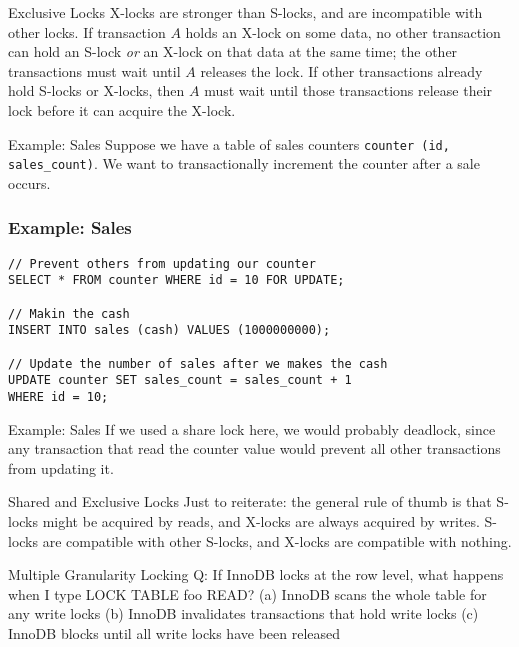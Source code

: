 \documentclass[14pt]{beamer}
\begin{document}
\begin{frame}{Exclusive Locks}
  X-locks are stronger than S-locks, and are incompatible with other locks. If
  transaction $A$ holds an X-lock on some data, no other transaction can hold an
  S-lock \emph{or} an X-lock on that data at the same time; the other
  transactions must wait until $A$ releases the lock.
  \newline
  \newline
  If other transactions already hold S-locks or X-locks, then $A$ must wait
  until those transactions release their lock before it can acquire the X-lock.
\end{frame}

\begin{frame}{Example: Sales}
  Suppose we have a table of sales counters \texttt{counter (id, sales\_count)}.
  We want to transactionally increment the counter after a sale occurs.
\end{frame}

\begin{frame}[fragile]
  \frametitle{Example: Sales}
  \begingroup
    \fontsize {10pt}{12pt}\selectfont
    \begin{verbatim}
// Prevent others from updating our counter
SELECT * FROM counter WHERE id = 10 FOR UPDATE;

// Makin the cash
INSERT INTO sales (cash) VALUES (1000000000);

// Update the number of sales after we makes the cash
UPDATE counter SET sales_count = sales_count + 1
WHERE id = 10;
    \end{verbatim}
  \endgroup
\end{frame}

\begin{frame}{Example: Sales}
  If we used a share lock here, we would probably deadlock, since any
  transaction that read the counter value would prevent all other transactions
  from updating it.
\end{frame}

\begin{frame}{Shared and Exclusive Locks}
  Just to reiterate: the general rule of thumb is that S-locks might be acquired
  by reads, and X-locks are always acquired by writes. S-locks are compatible
  with other S-locks, and X-locks are compatible with nothing.
\end{frame}

\begin{frame}{Multiple Granularity Locking}
  Q: If InnoDB locks at the row level, what happens when I type LOCK TABLE foo
  READ?
  \newline
  \pause
  (a) InnoDB scans the whole table for any write locks
  \newline
  \pause
  (b) InnoDB invalidates transactions that hold write locks
  \newline
  \pause
  (c) InnoDB blocks until all write locks have been released
  \newline
  \pause
\end{frame}
\end{document}
